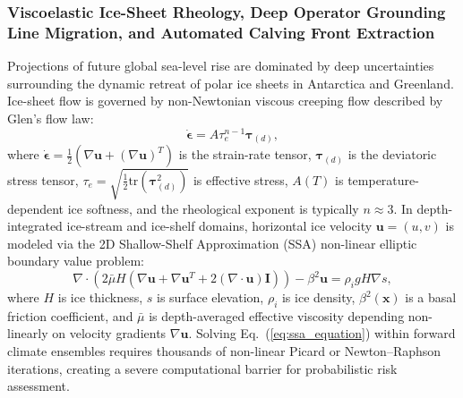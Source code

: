 \subsubsection{Viscoelastic Ice-Sheet Rheology, Deep Operator Grounding Line Migration, and Automated Calving Front Extraction}
Projections of future global sea-level rise are dominated by deep uncertainties surrounding the dynamic retreat of polar ice sheets in Antarctica and Greenland. Ice-sheet flow is governed by non-Newtonian viscous creeping flow described by Glen's flow law:
\begin{equation}
    \dot{\boldsymbol{\epsilon}} = A \tau_e^{n-1} \boldsymbol{\tau}_{(d)},
    \label{eq:glens_law}
\end{equation}
where $\dot{\boldsymbol{\epsilon}} = \frac{1}{2}(\nabla \mathbf{u} + (\nabla \mathbf{u})^T)$ is the strain-rate tensor, $\boldsymbol{\tau}_{(d)}$ is the deviatoric stress tensor, $\tau_e = \sqrt{\frac{1}{2} \text{tr}(\boldsymbol{\tau}_{(d)}^2)}$ is effective stress, $A(T)$ is temperature-dependent ice softness, and the rheological exponent is typically $n \approx 3$. In depth-integrated ice-stream and ice-shelf domains, horizontal ice velocity $\mathbf{u} = (u, v)$ is modeled via the 2D Shallow-Shelf Approximation (SSA) non-linear elliptic boundary value problem:
\begin{equation}
    \nabla \cdot \left( 2 \bar{\mu} H \left( \nabla \mathbf{u} + \nabla \mathbf{u}^T + 2(\nabla \cdot \mathbf{u})\mathbf{I} \right) \right) - \beta^2 \mathbf{u} = \rho_i g H \nabla s,
    \label{eq:ssa_equation}
\end{equation}
where $H$ is ice thickness, $s$ is surface elevation, $\rho_i$ is ice density, $\beta^2(\mathbf{x})$ is a basal friction coefficient, and $\bar{\mu}$ is depth-averaged effective viscosity depending non-linearly on velocity gradients $\nabla \mathbf{u}$. Solving Eq.~(\ref{eq:ssa_equation}) within forward climate ensembles requires thousands of non-linear Picard or Newton--Raphson iterations, creating a severe computational barrier for probabilistic risk assessment.

